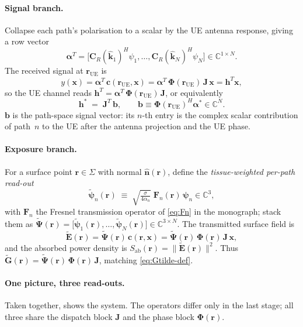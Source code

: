 \documentclass[11pt,a4paper]{article}
\theoremstyle{definition}
\newcommand{\khat}{\hat{\bm{k}}}
\newcommand{\nhat}{\hat{\bm{n}}}
\newcommand{\rr}{\mathbf{r}}
\newcommand{\EE}{\mathbf{E}}
\newcommand{\Sab}{S_{\mathrm{ab}}}
\newcommand{\Complex}{\mathbb{C}}
\newcommand{\Jmat}{\mathbf{J}}                 %
\newcommand{\Phimat}{\mathbf{\Phi}}            %
\newcommand{\Psitil}{\tilde{\bm{\Psi}}}        %
\newcommand{\xx}{\mathbf{x}}
\newcommand{\hh}{\mathbf{h}}
\newcommand{\cvec}{\mathbf{c}}
\newcommand{\bvec}{\mathbf{b}}
\newcommand{\alphavec}{\bm{\alpha}}
\newcommand{\psin}{\bm{\psi}_n}
\newcommand{\Fn}{\mathbf{F}_n}
\newcommand{\FnR}{\mathbf{F}_n(\rr)}
\newcommand{\Gtil}{\tilde{\mathbf{G}}}
\newcommand{\Sigmabody}{\Sigma}
\begin{document}
\paragraph{Signal branch.} Collapse each path's polarisation to a scalar
by the UE antenna response, giving a row vector
\begin{equation}\label{eq:alpha-def}
  \alphavec^T=\bigl[\mathbf{C}_R(\khat_1)^H\psi_1,\dots,
  \mathbf{C}_R(\khat_N)^H\psi_N\bigr]\in\Complex^{1\times N}.
\end{equation}
The received signal at $\rr_\mathrm{UE}$ is
\begin{equation}\label{eq:y-via-carrier}
  y(\xx)=\alphavec^T\,\cvec(\rr_\mathrm{UE},\xx)
        =\alphavec^T\,\Phimat(\rr_\mathrm{UE})\,\Jmat\,\xx
        =\hh^T\xx,
\end{equation}
so the UE channel reads
$\hh^T=\alphavec^T\,\Phimat(\rr_\mathrm{UE})\,\Jmat$, or
equivalently
\begin{equation}\label{eq:h-path}
  \boxed{\;
  \hh^*\;=\;\Jmat^T\,\bvec,\qquad
  \bvec\equiv\Phimat(\rr_\mathrm{UE})^H\alphavec^*\in\Complex^N.
  \;}
\end{equation}
$\bvec$ is the path-space signal vector: its $n$-th entry is the complex
scalar contribution of path~$n$ to the UE after the antenna projection and
the UE phase.

\paragraph{Exposure branch.} For a surface point $\rr\in\Sigmabody$ with
normal $\nhat(\rr)$, define the \emph{tissue-weighted per-path read-out}
\begin{equation}\label{eq:psitil-def}
  \tilde{\bm\psi}_n(\rr)\;\equiv\;
  \sqrt{\tfrac{\sigma}{4\alpha_n}}\;\FnR\,\psin\in\Complex^3,
\end{equation}
with $\Fn$ the Fresnel transmission operator of \cref{eq:Fn} in the
monograph; stack them as
$\Psitil(\rr)=\bigl[\tilde{\bm\psi}_1(\rr),\dots,
\tilde{\bm\psi}_N(\rr)\bigr]\in\Complex^{3\times N}$.
The transmitted surface field is
\begin{equation}\label{eq:Etil-via-carrier}
  \tilde{\EE}(\rr)=\Psitil(\rr)\,\cvec(\rr,\xx)
                 =\Psitil(\rr)\,\Phimat(\rr)\,\Jmat\,\xx,
\end{equation}
and the absorbed power density is $\Sab(\rr)=\|\tilde{\EE}(\rr)\|^2$.
Thus $\Gtil(\rr)=\Psitil(\rr)\,\Phimat(\rr)\,\Jmat$, matching
\cref{eq:Gtilde-def}.

\paragraph{One picture, three read-outs.}  Taken together,
 shows the system.  The operators differ only in the
last stage; all three share the dispatch block $\Jmat$ and the phase block
$\Phimat(\rr)$.
\end{document}
